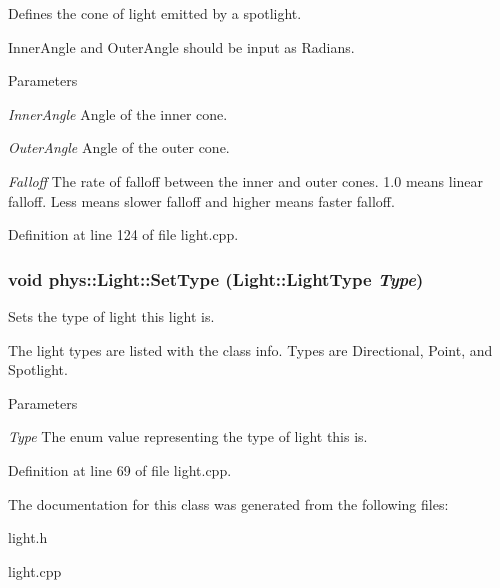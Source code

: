 Defines the cone of light emitted by a spotlight. 

InnerAngle and OuterAngle should be input as Radians. 
\begin{DoxyParams}{Parameters}
\item[{\em InnerAngle}]Angle of the inner cone. \item[{\em OuterAngle}]Angle of the outer cone. \item[{\em Falloff}]The rate of falloff between the inner and outer cones. 1.0 means linear falloff. Less means slower falloff and higher means faster falloff. \end{DoxyParams}


Definition at line 124 of file light.cpp.

\hypertarget{classphys_1_1Light_a87fced0afb0fd44d333c499d41e8568a}{
\subsubsection[{SetType}]{\setlength{\rightskip}{0pt plus 5cm}void phys::Light::SetType (Light::LightType {\em Type})}}
\label{dc/df1/classphys_1_1Light_a87fced0afb0fd44d333c499d41e8568a}


Sets the type of light this light is. 

The light types are listed with the class info. Types are Directional, Point, and Spotlight. 
\begin{DoxyParams}{Parameters}
\item[{\em Type}]The enum value representing the type of light this is. \end{DoxyParams}


Definition at line 69 of file light.cpp.



The documentation for this class was generated from the following files:\begin{DoxyCompactItemize}
\item 
light.h\item 
light.cpp\end{DoxyCompactItemize}
